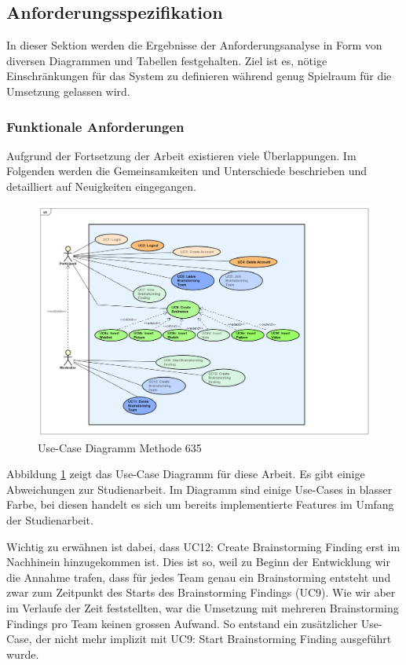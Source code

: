\subsection{Anforderungsspezifikation}
In dieser Sektion werden die Ergebnisse der Anforderungsanalyse in Form von diversen Diagrammen und Tabellen festgehalten. Ziel ist es, nötige Einschränkungen für das System zu definieren während genug Spielraum für die Umsetzung gelassen wird. 

\subsubsection{Funktionale Anforderungen}\label{sec:functional-requirements}
Aufgrund der Fortsetzung der Arbeit existieren viele Überlappungen. Im Folgenden werden die Gemeinsamkeiten und Unterschiede beschrieben und detailliert auf Neuigkeiten eingegangen. 


\begin{figure}[h]
	\centering
	\includegraphics[width=1\linewidth]{./img/anforderungen/UC-Methode635.png}
	\caption{Use-Case Diagramm Methode 635}
	\label{fig:uc-methode635}
\end{figure}
Abbildung \ref{fig:uc-methode635} zeigt das Use-Case Diagramm für diese Arbeit. Es gibt einige Abweichungen zur Studienarbeit. Im Diagramm sind einige Use-Cases in blasser Farbe, bei diesen handelt es sich um bereits implementierte Features im Umfang der Studienarbeit. 

Wichtig zu erwähnen ist dabei, dass UC12: Create Brainstorming Finding erst im Nachhinein hinzugekommen ist. Dies ist so, weil zu Beginn der Entwicklung wir die Annahme trafen, dass für jedes Team genau ein Brainstorming entsteht und zwar zum Zeitpunkt des Starts des Brainstorming Findings (UC9). Wie wir aber im Verlaufe der Zeit feststellten, war die Umsetzung mit mehreren Brainstorming Findings pro Team keinen grossen Aufwand. So entstand ein zusätzlicher Use-Case, der nicht mehr implizit mit UC9: Start Brainstorming Finding ausgeführt wurde.

